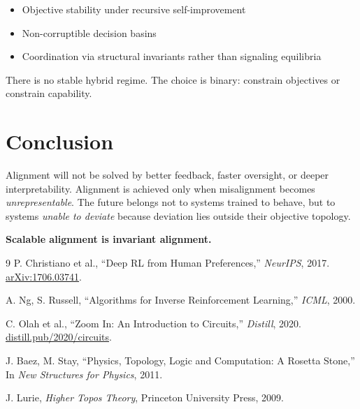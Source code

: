 \documentclass[11pt,a4paper]{article}
\theoremstyle{plain}
\theoremstyle{definition}
\numberwithin{equation}{section}
\begin{document}
\begin{itemize}
    \item Objective stability under recursive self-improvement
    \item Non-corruptible decision basins
    \item Coordination via structural invariants rather than signaling equilibria
\end{itemize}

There is no stable hybrid regime. The choice is binary: constrain objectives or constrain capability.


\section{Conclusion}

Alignment will not be solved by better feedback, faster oversight, or deeper interpretability. Alignment is achieved only when misalignment becomes \emph{unrepresentable}. The future belongs not to systems trained to behave, but to systems \emph{unable to deviate} because deviation lies outside their objective topology.

\textbf{Scalable alignment is invariant alignment.}


\begin{thebibliography}{9}
 P. Christiano et al., ``Deep RL from Human Preferences,'' \emph{NeurIPS}, 2017. \href{https://arxiv.org/abs/1706.03741}{arXiv:1706.03741}.

 A. Ng, S. Russell, ``Algorithms for Inverse Reinforcement Learning,'' \emph{ICML}, 2000.

 C. Olah et al., ``Zoom In: An Introduction to Circuits,'' \emph{Distill}, 2020. \href{https://distill.pub/2020/circuits/zoom-in/}{distill.pub/2020/circuits}.

 J. Baez, M. Stay, ``Physics, Topology, Logic and Computation: A Rosetta Stone,'' In \emph{New Structures for Physics}, 2011.

 J. Lurie, \emph{Higher Topos Theory}, Princeton University Press, 2009.

\end{thebibliography}
\end{document}
